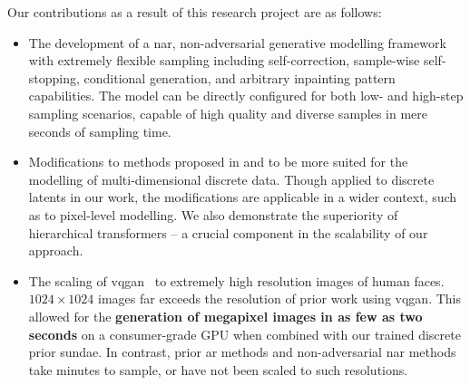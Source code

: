 Our contributions as a result of this research project are as follows:
\begin{itemize}
    \item
        The development of a \acrlong{nar}, non-adversarial generative modelling
        framework with extremely flexible sampling including self-correction,
        sample-wise self-stopping, conditional generation, and arbitrary
        inpainting pattern capabilities. The model can be directly configured
        for both low- and high-step sampling scenarios, capable of high
        quality and diverse samples in mere seconds of sampling time.
    \item
        Modifications to methods proposed in \citet{savinov2022stepunrolled} and
        \citet{nawrot2021hierarchical} to be more suited for the modelling of
        multi-dimensional discrete data. Though applied to discrete latents in
        our work, the modifications are applicable in a wider context,
        such as to pixel-level modelling. We also demonstrate the superiority of
        hierarchical transformers -- a crucial component in the scalability
        of our approach. 
    \item
        The scaling of \gls{vqgan}~\cite{esser2021taming} to extremely high
        resolution images of human faces. $1024 \times 1024$ images far exceeds
        the resolution of prior work using \gls{vqgan}. This allowed for the
        \textbf{generation of megapixel images in as few as two seconds} on a
        consumer-grade GPU when combined with our trained discrete prior
        \gls{sundae}. In contrast, prior \gls{ar} methods and non-adversarial
        \gls{nar} methods take minutes to sample, or have not been scaled to
        such resolutions.
\end{itemize}
